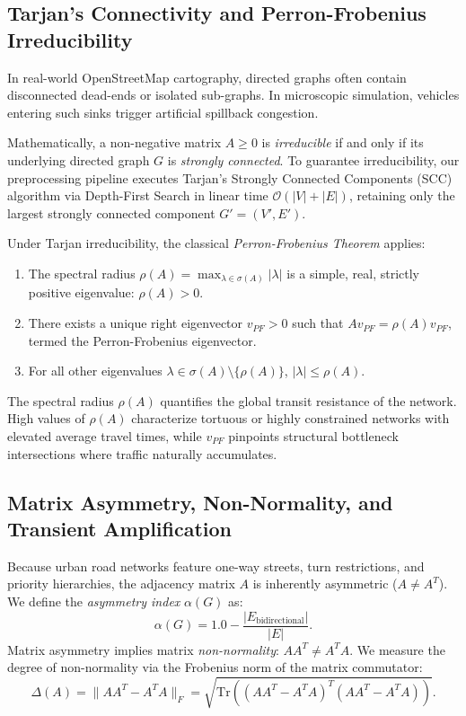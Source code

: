 \documentclass[lettersize,journal]{IEEEtran}
\begin{document}
\subsection{Tarjan's Connectivity and Perron-Frobenius Irreducibility}
In real-world OpenStreetMap cartography, directed graphs often contain disconnected dead-ends or isolated sub-graphs. In microscopic simulation, vehicles entering such sinks trigger artificial spillback congestion.

Mathematically, a non-negative matrix $A \ge 0$ is \emph{irreducible} if and only if its underlying directed graph $G$ is \emph{strongly connected}. To guarantee irreducibility, our preprocessing pipeline executes Tarjan's Strongly Connected Components (SCC) algorithm \cite{Tarjan1972} via Depth-First Search in linear time $\mathcal{O}(|V| + |E|)$, retaining only the largest strongly connected component $G' = (V', E')$.

Under Tarjan irreducibility, the classical \emph{Perron-Frobenius Theorem} applies:
\begin{enumerate}
    \item The spectral radius $\rho(A) = \max_{\lambda \in \sigma(A)} |\lambda|$ is a simple, real, strictly positive eigenvalue: $\rho(A) > 0$.
    \item There exists a unique right eigenvector $v_{PF} > 0$ such that $A v_{PF} = \rho(A) v_{PF}$, termed the Perron-Frobenius eigenvector.
    \item For all other eigenvalues $\lambda \in \sigma(A) \setminus \{\rho(A)\}$, $|\lambda| \le \rho(A)$.
\end{enumerate}
The spectral radius $\rho(A)$ quantifies the global transit resistance of the network. High values of $\rho(A)$ characterize tortuous or highly constrained networks with elevated average travel times, while $v_{PF}$ pinpoints structural bottleneck intersections where traffic naturally accumulates.

\subsection{Matrix Asymmetry, Non-Normality, and Transient Amplification}
Because urban road networks feature one-way streets, turn restrictions, and priority hierarchies, the adjacency matrix $A$ is inherently asymmetric ($A \neq A^T$). We define the \emph{asymmetry index} $\alpha(G)$ as:
\begin{equation}
\alpha(G) = 1.0 - \frac{|E_{\text{bidirectional}}|}{|E|}.
\end{equation}
Matrix asymmetry implies matrix \emph{non-normality}: $A A^T \neq A^T A$. We measure the degree of non-normality via the Frobenius norm of the matrix commutator:
\begin{equation}
\Delta(A) = \| A A^T - A^T A \|_F = \sqrt{\text{Tr}\left( (A A^T - A^T A)^T (A A^T - A^T A) \right)}.
\end{equation}
\end{document}
